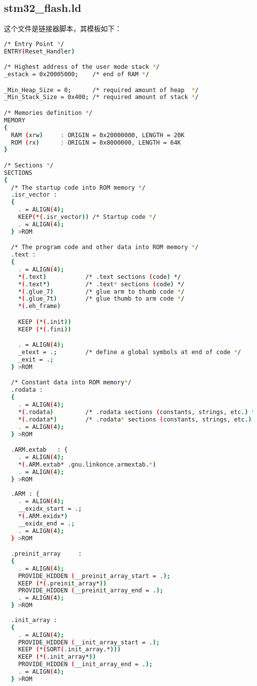\subsection{stm32\_flash.ld}
这个文件是链接器脚本，其模板如下：
\begin{lstlisting}[language=bash, style=customStyleMakefile, caption=stm32\_flash.ld]
/* Entry Point */
ENTRY(Reset_Handler)

/* Highest address of the user mode stack */
_estack = 0x20005000;    /* end of RAM */

_Min_Heap_Size = 0;      /* required amount of heap  */
_Min_Stack_Size = 0x400; /* required amount of stack */

/* Memories definition */
MEMORY
{
  RAM (xrw)		: ORIGIN = 0x20000000, LENGTH = 20K
  ROM (rx)		: ORIGIN = 0x8000000, LENGTH = 64K
}

/* Sections */
SECTIONS
{
  /* The startup code into ROM memory */
  .isr_vector :
  {
    . = ALIGN(4);
    KEEP(*(.isr_vector)) /* Startup code */
    . = ALIGN(4);
  } >ROM

  /* The program code and other data into ROM memory */
  .text :
  {
    . = ALIGN(4);
    *(.text)           /* .text sections (code) */
    *(.text*)          /* .text* sections (code) */
    *(.glue_7)         /* glue arm to thumb code */
    *(.glue_7t)        /* glue thumb to arm code */
    *(.eh_frame)

    KEEP (*(.init))
    KEEP (*(.fini))

    . = ALIGN(4);
    _etext = .;        /* define a global symbols at end of code */
    _exit = .;
  } >ROM

  /* Constant data into ROM memory*/
  .rodata :
  {
    . = ALIGN(4);
    *(.rodata)         /* .rodata sections (constants, strings, etc.) */
    *(.rodata*)        /* .rodata* sections (constants, strings, etc.) */
    . = ALIGN(4);
  } >ROM

  .ARM.extab   : { 
  	. = ALIGN(4);
  	*(.ARM.extab* .gnu.linkonce.armextab.*)
  	. = ALIGN(4);
  } >ROM
  
  .ARM : {
    . = ALIGN(4);
    __exidx_start = .;
    *(.ARM.exidx*)
    __exidx_end = .;
    . = ALIGN(4);
  } >ROM

  .preinit_array     :
  {
    . = ALIGN(4);
    PROVIDE_HIDDEN (__preinit_array_start = .);
    KEEP (*(.preinit_array*))
    PROVIDE_HIDDEN (__preinit_array_end = .);
    . = ALIGN(4);
  } >ROM
  
  .init_array :
  {
    . = ALIGN(4);
    PROVIDE_HIDDEN (__init_array_start = .);
    KEEP (*(SORT(.init_array.*)))
    KEEP (*(.init_array*))
    PROVIDE_HIDDEN (__init_array_end = .);
    . = ALIGN(4);
  } >ROM
  

\end{lstlisting}
